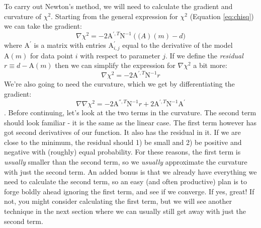 \documentclass[letterpaper,11pt,preprint]{aastex}
\begin{document}
{To carry out Newton's method, we will need to calculate the gradient
and curvature of $\chi^2$. Starting from the general expression for
$\chi^2$ (Equation \ref{eq:chisq}) we can take the gradient:
$$\nabla \chi^2 = -2 \mathrm{A}^{',T} \mathrm{N}^{-1}(
\mathrm(A)(m)-d)$$ 
where $\mathrm{A}^{'}$ is a matrix with entries $\mathrm{A}^{'}_{i,j}$
equal to the derivative of the model $\mathrm{A}(m)$ for data point
$i$ with respect to parameter $j$.  If we define the \textit{residual}
$r \equiv d-\mathrm{A}(m)$ then we can simplify the expression for
$\nabla \chi^2$ a bit more:
$$\nabla \chi^2 = -2\mathrm{A}^{',T} \mathrm{N}^{-1} r$$
We're also going to need the curvature, which we get by
differentiating the gradient:
$$\nabla \nabla \chi^2 = -2 \mathrm{A}^{'',T} \mathrm{N}^{-1} r + 2
\mathrm{A}^{',T} \mathrm{N}^{-1} \mathrm{A}^{'}$$.  Before continuing,
let's look at the two terms in the curvature.  The second term should
look familiar - it is the same as the linear case.  The first term
however has got second derivatives of our function.  It also has the
residual in it.  If we are close to the minimum, the residual should
1) be small and 2) be positive and negative with (roughly) equal
probability.  For these reasons, the first term is \textit{usually}
smaller than the second term, so we \textit{usually} approximate the
curvature with just the second term.  An added bonus is that we
already have everything we need to calculate the second term, so an
easy (and often productive) plan is to forge boldly ahead ignoring the
first term, and see if we converge.  If yes, great!  If not, you might
consider calculating the first term, but we will see another technique
in the next section where we can usually still get away with just the
second term.  

}
\end{document}
